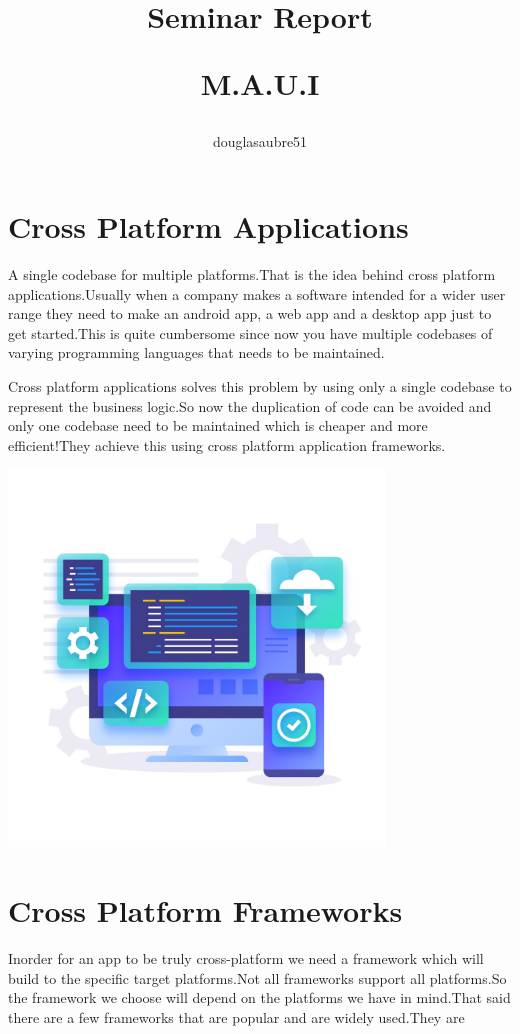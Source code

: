 \documentclass[14pt]{extarticle}
\title{
     \huge Seminar Report \par
     \Huge M.A.U.I
}
\author{
    douglasaubre51
}
\begin{document}
\maketitle
{}

\newpage
\tableofcontents
{}
\newpage
\section{
  Cross Platform Applications
 }
\parbox{\linewidth}{
    A single codebase for multiple platforms.That is the idea behind cross platform applications.Usually when a company makes a software intended for a wider user range they need to make an android app, a web app and a desktop app just to get started.This is quite cumbersome since now you have multiple codebases of varying programming languages that needs to be maintained.
}

\parbox{\linewidth}{
    Cross platform applications solves this problem by using only a single codebase to represent the business logic.So now the duplication of code can be avoided and only one codebase need to be maintained which is cheaper and more efficient!They achieve this using cross platform application frameworks.
}

\begin{center}
    \includegraphics[width=100mm,height=100mm,keepaspectratio]{cross-platform-app.jpg}
\end{center}

\newpage
\section{
  Cross Platform Frameworks
 }
\parbox{\linewidth}{
    Inorder for an app to be truly cross-platform we need a framework which will build to the specific target platforms.Not all frameworks support all platforms.So the framework we choose will depend on the platforms we have in mind.That said there are a few frameworks that are popular and are widely used.They are
}
\end{document}

